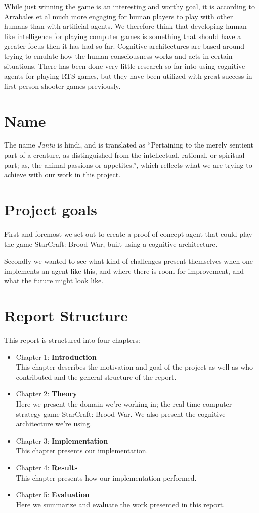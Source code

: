 While just winning the game is an interesting and worthy goal, it is according to Arrabales et al much more engaging for human players to play with other humans than with artificial agents.\cite{arrabales2009gamechars} We therefore think that developing human-like intelligence for playing computer games is something that should have a greater focus then it has had so far. Cognitive architectures are based around trying to emulate how the human consciousness works and acts in certain situations. There has been done very little research so far into using cognitive agents for playing RTS games, but they have been utilized with great success in first person shooter games previously. %

\section{Name}
\label{sec:name}
The name {\em Jantu} is hindi, and is translated as ``Pertaining to the merely sentient part of a creature, as distinguished from the intellectual, rational, or spiritual part; as, the animal passions or appetites.''\cite{hindijantu}, which reflects what we are trying to achieve with our work in this project.

\section{Project goals}
\label{sec:goals}
First and foremost we set out to create a proof of concept agent that could play the game StarCraft: Brood War, built using a cognitive architecture.

Secondly we wanted to see what kind of challenges present themselves when one implements an agent like this, and where there is room for improvement, and what the future might look like.

\section{Report Structure}
\label{sec:structure}
This report is structured into four chapters:
\begin{itemize}
\item Chapter 1: \textbf{Introduction} \\
This chapter describes the motivation and goal of the project as well as who
contributed and the general structure of the report.
\item Chapter 2: \textbf{Theory} \\
Here we present the domain we're working in; the real-time computer strategy game StarCraft: Brood War. We also present the cognitive architecture we're using.
\item Chapter 3: \textbf{Implementation} \\
This chapter presents our implementation.
\item Chapter 4: \textbf{Results} \\
This chapter presents how our implementation performed.
\item Chapter 5: \textbf{Evaluation} \\
Here we summarize and evaluate the work presented in this report.

\end{itemize}